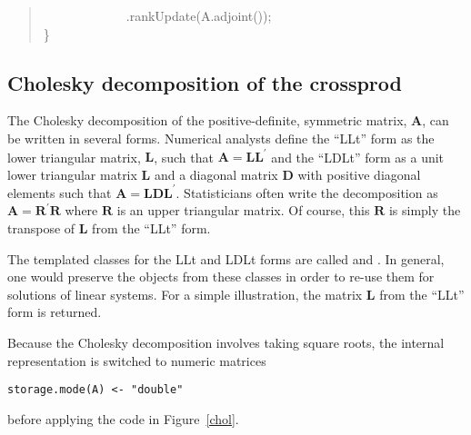 \documentclass[shortnames,article]{jss}
\newcommand{\hlstd}[1]{\textcolor[rgb]{0,0,0}{#1}}
\newcommand{\hlopt}[1]{\textcolor[rgb]{0,0,0}{#1}}
\newcommand{\hlkwd}[1]{\textcolor[rgb]{0,0,0}{#1}}
\begin{document}
\begin{quote}
  \hlstd{}\hlstd{\ \ \ \ \ \ \ \ \ \ \ \ \ }\hlstd{}\hlopt{.}\hlstd{}\hlkwd{rankUpdate}\hlstd{}\hlopt{(}\hlstd{A}\hlopt{.}\hlstd{}\hlkwd{adjoint}\hlstd{}\hlopt{());}\hspace*{\fill}\\
  \hlstd{}\hlopt{\}}\hlstd{}\hspace*{\fill}\\
  \mbox{}
  \normalfont
  \normalsize
\end{quote}


\subsection{Cholesky decomposition of the crossprod}
\label{sec:chol}

The Cholesky decomposition of the positive-definite, symmetric matrix,
$\bm A$, can be written in several forms.  Numerical analysts define
the ``LLt'' form as the lower triangular matrix, $\bm L$, such that
$\bm A=\bm L\bm L^\prime$ and the ``LDLt'' form as a unit lower
triangular matrix $\bm L$ and a diagonal matrix $\bm D$ with positive
diagonal elements such that $\bm A=\bm L\bm D\bm L^\prime$.
Statisticians often write the decomposition as $\bm A=\bm R^\prime\bm
R$ where $\bm R$ is an upper triangular matrix.  Of course, this $\bm
R$ is simply the transpose of $\bm L$ from the ``LLt'' form.

The templated  classes for the LLt and LDLt forms are
called  and .  In general, one would preserve the
objects from these classes in order to re-use them for solutions of
linear systems.  For a simple illustration, the matrix $\bm L$
from the ``LLt'' form is returned.

Because the Cholesky decomposition involves taking square roots, the internal
representation is switched to numeric matrices
\begin{verbatim}
storage.mode(A) <- "double"
\end{verbatim}
before applying the code in Figure~\ref{chol}.
\end{document}
